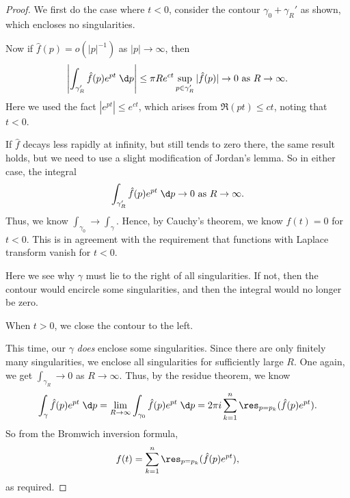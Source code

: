 \documentclass[a4paper]{article}
\begin{document}
\begin{proof}
  We first do the case where $t < 0$, consider the contour $\gamma_0 + \gamma_R'$ as shown, which encloses no singularities.
  \begin{center}
  \end{center}
  Now if $\hat{f}(p) = o(|p|^{-1})$ as $|p| \to \infty$, then
  \[
    \left|\int_{\gamma_R'} \hat{f}(p) e^{pt}\;\d p\right| \leq \pi R e^{ct} \sup_{p \in \gamma_R'} |\hat{f}(p)| \to 0 \text{ as }R \to \infty.
  \]
  Here we used the fact $|e^{pt}| \leq e^{ct}$, which arises from $\Re (pt) \leq ct$, noting that $t < 0$.

  If $\hat{f}$ decays less rapidly at infinity, but still tends to zero there, the same result holds, but we need to use a slight modification of Jordan's lemma. So in either case, the integral
  \[
    \int_{\gamma_R'} \hat{f}(p) e^{pt}\;\d p \to 0\text{ as }R\to \infty.
  \]
  Thus, we know $\int_{\gamma_0} \to \int_\gamma$. Hence, by Cauchy's theorem, we know $f(t) = 0$ for $t < 0$. This is in agreement with the requirement that functions with Laplace transform vanish for $t < 0$.

  Here we see why $\gamma$ must lie to the right of all singularities. If not, then the contour would encircle some singularities, and then the integral would no longer be zero.

  When $t > 0$, we close the contour to the left.
  \begin{center}
  \end{center}
  This time, our $\gamma$ \emph{does} enclose some singularities. Since there are only finitely many singularities, we enclose all singularities for sufficiently large $R$. One again, we get $\int_{\gamma_R} \to 0$ as $R \to \infty$. Thus, by the residue theorem, we know
  \[
    \int_{\gamma} \hat{f}(p) e^{pt} \;\d p = \lim_{R \to \infty} \int_{\gamma_0}\hat{f}(p) e^{pt}\;\d p = 2\pi i \sum_{k = 1}^n \res_{p = p_k} (\hat{f}(p) e^{pt}).
  \]
  So from the Bromwich inversion formula,
  \[
    f(t) = \sum_{k = 1}^n \res_{p = p_k} (\hat{f}(p) e^{pt}),
  \]
  as required.
\end{proof}
\end{document}

